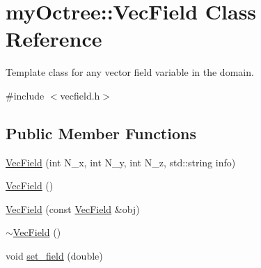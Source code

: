 \hypertarget{classmy_octree_1_1_vec_field}{}\section{my\+Octree\+:\+:Vec\+Field Class Reference}
\label{classmy_octree_1_1_vec_field}


Template class for any vector field variable in the domain.  




{\ttfamily \#include $<$vecfield.\+h$>$}

\subsection*{Public Member Functions}
\begin{DoxyCompactItemize}
\item 
\hyperlink{classmy_octree_1_1_vec_field_a5021e31d76839465f3318f3a3683b18c}{Vec\+Field} (int N\+\_\+x, int N\+\_\+y, int N\+\_\+z, std\+::string info)
\item 
\hyperlink{classmy_octree_1_1_vec_field_af0707293837aa0859b5db3a04fbffb05}{Vec\+Field} ()
\item 
\hyperlink{classmy_octree_1_1_vec_field_aeff8e646de1132faa201d47a3c642646}{Vec\+Field} (const \hyperlink{classmy_octree_1_1_vec_field}{Vec\+Field} \&obj)
\item 
\hyperlink{classmy_octree_1_1_vec_field_ab1e3289a3e303b2ea3e96ec7b1a14bb9}{$\sim$\+Vec\+Field} ()
\item 
void \hyperlink{classmy_octree_1_1_vec_field_ac781590a91fca63a6a3be0ddaf117860}{set\+\_\+field} (double)
\end{DoxyCompactItemize}
